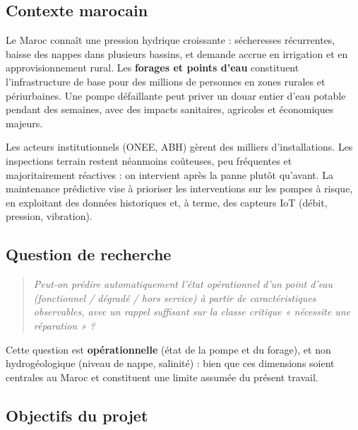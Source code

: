 \documentclass[11pt,a4paper]{report}
\begin{document}
\subsection{Contexte marocain}

Le Maroc connaît une pression hydrique croissante : sécheresses récurrentes, baisse des nappes dans plusieurs bassins, et demande accrue en irrigation et en approvisionnement rural. Les \textbf{forages et points d'eau} constituent l'infrastructure de base pour des millions de personnes en zones rurales et périurbaines. Une pompe défaillante peut priver un douar entier d'eau potable pendant des semaines, avec des impacts sanitaires, agricoles et économiques majeurs.

Les acteurs institutionnels (ONEE, ABH) gèrent des milliers d'installations. Les inspections terrain restent néanmoins coûteuses, peu fréquentes et majoritairement réactives : on intervient après la panne plutôt qu'avant. La maintenance prédictive vise à prioriser les interventions sur les pompes à risque, en exploitant des données historiques et, à terme, des capteurs IoT (débit, pression, vibration).

\subsection{Question de recherche}

\begin{quote}

\textit{Peut-on prédire automatiquement l'état opérationnel d'un point d'eau (fonctionnel / dégradé / hors service) à partir de caractéristiques observables, avec un rappel suffisant sur la classe critique « nécessite une réparation » ?}

\end{quote}

Cette question est \textbf{opérationnelle} (état de la pompe et du forage), et non hydrogéologique (niveau de nappe, salinité) : bien que ces dimensions soient centrales au Maroc et constituent une limite assumée du présent travail.

\subsection{Objectifs du projet}
\end{document}
